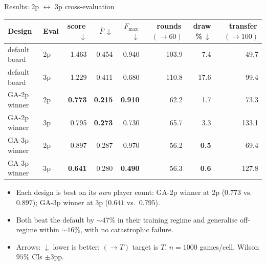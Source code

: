 \documentclass[10pt,aspectratio=169]{beamer}
\begin{document}
\begin{frame}{Results: 2p $\leftrightarrow$ 3p cross-evaluation}
  \centering
  \small
  \begin{tabular}{llrrrrrr}
    \toprule
    Design & Eval & score\,$\downarrow$ & $\overline{F}$\,$\downarrow$ & $F_{\max}$\,$\downarrow$ & rounds\,$(\!\to\!60)$ & draw \%\,$\downarrow$ & transfer\,$(\!\to\!100)$ \\
    \midrule
    default board & 2p & 1.463 & 0.454 & 0.940 & 103.9 &  7.4 &  49.7 \\
    default board & 3p & 1.229 & 0.411 & 0.680 & 110.8 & 17.6 &  99.4 \\
    \addlinespace
    GA-2p winner  & 2p & \textbf{0.773} & \textbf{0.215} & \textbf{0.910} &  62.2 &  1.7 &  73.3 \\
    GA-2p winner  & 3p & 0.795 & \textbf{0.273} & 0.730 &  65.7 &  3.3 & 133.1 \\
    \addlinespace
    GA-3p winner  & 2p & 0.897 & 0.287 & 0.970 &  56.2 &  \textbf{0.5} &  69.4 \\
    GA-3p winner  & 3p & \textbf{0.641} & 0.280 & \textbf{0.490} &  56.3 &  \textbf{0.6} & 127.8 \\
    \bottomrule
  \end{tabular}
  \vspace{0.8em}
  \begin{itemize}\small\itemsep=0.3em
    \item Each design is best on its \emph{own} player count: GA-2p winner at 2p ($0.773$ vs.\ $0.897$); GA-3p winner at 3p ($0.641$ vs.\ $0.795$).
    \item Both beat the default by $\sim$$47\%$ in their training regime and generalise off-regime within $\sim$$16\%$, with no catastrophic failure.
    \item Arrows: $\downarrow$ lower is better; $(\!\to\!T)$ target is $T$. $n{=}1000$ games/cell, Wilson $95\%$ CIs $\pm3$pp.
  \end{itemize}
\end{frame}
\end{document}
